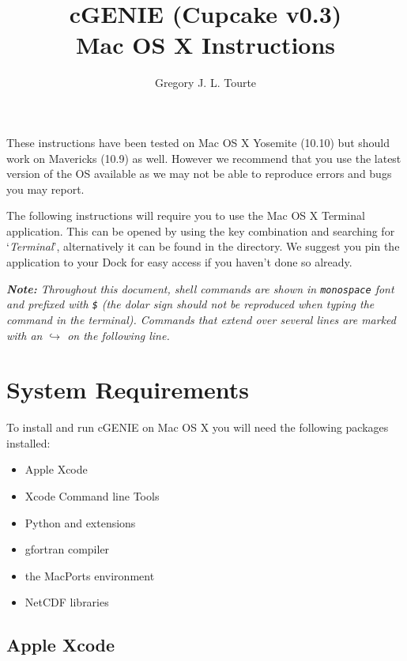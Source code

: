 \documentclass{scrartcl}
\title{cGENIE (Cupcake v0.3)\\
Mac OS X Instructions}
\author{Gregory J. L. Tourte}
\begin{document}
\maketitle

These instructions have been tested on Mac OS X Yosemite (10.10) but should
work on Mavericks (10.9) as well. However we recommend that you use the latest
version of the OS available as we may not be able to reproduce errors and bugs
you may report.

The following instructions will require you to use the Mac OS X Terminal
application. This can be opened by using the \keys{\cmd+\SPACE} key combination
and searching for `\textit{Terminal}', alternatively it can be found in the
 directory. We suggest you pin
the application to your Dock for easy access if you haven't done so already.

{\itshape \textbf{Note:} Throughout this document, shell commands are shown in
\textup{\texttt{monospace}} font and prefixed with \textup{\texttt{\$}} (the
dolar sign should not be reproduced when typing the command in the terminal).
Commands that extend over several lines are marked with an
{\tiny\ensuremath{\hookrightarrow}} on the following line.}

\section{System Requirements}

To install and run cGENIE on Mac OS X you will need the following packages
installed:

\begin{itemize}
	\item Apple Xcode
	\item Xcode Command line Tools
	\item Python and extensions
	\item gfortran compiler 
	\item the MacPorts environment
	\item NetCDF libraries
\end{itemize}

\subsection{Apple Xcode}
\end{document}
